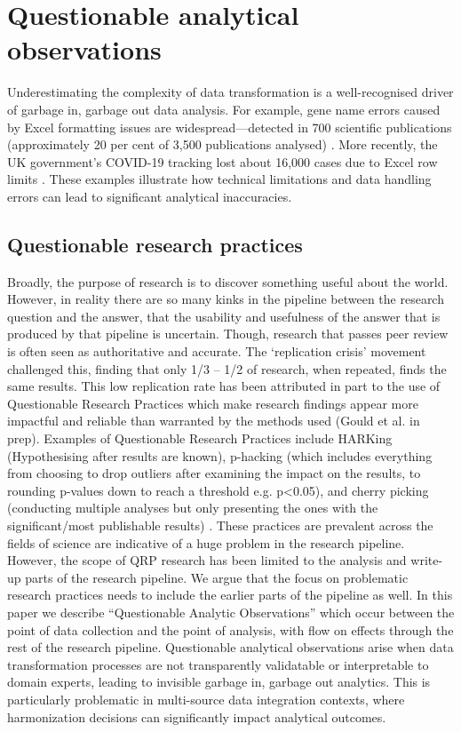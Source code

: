 \documentclass{article}
\begin{document}
\tableofcontents
\listoftables
\listoffigures


\section{Questionable analytical observations}

Underestimating the complexity of data transformation is a well-recognised driver of garbage in, garbage out data analysis. For example, gene name errors caused by Excel formatting issues are widespread---detected in 700 scientific publications (approximately 20 per cent of 3,500 publications analysed) \cite{ziemann2016gene}. More recently, the UK government's COVID-19 tracking lost about 16,000 cases due to Excel row limits \cite{bbc2020excel}. These examples illustrate how technical limitations and data handling errors can lead to significant analytical inaccuracies.

\subsection{Questionable research practices}

Broadly, the purpose of research is to discover something useful about the world. However, in reality there are so many kinks in the pipeline between the research question and the answer, that the usability and usefulness of the answer that is produced by that pipeline is uncertain. Though, research that passes peer review is often seen as authoritative and accurate. The ‘replication crisis’ movement challenged this, finding that only 1/3 – 1/2 of research, when repeated, finds the same results. This low replication rate has been attributed in part to the use of Questionable Research Practices which make research findings appear more impactful and reliable than warranted by the methods used (Gould et al. in prep). Examples of Questionable Research Practices include HARKing (Hypothesising after results are known), p-hacking (which includes everything from choosing to drop outliers after examining the impact on the results, to rounding p-values down to reach a threshold e.g. p<0.05), and cherry picking (conducting multiple analyses but only presenting the ones with the significant/most publishable results) \cite{john2012measuring}. These practices are prevalent across the fields of science \cite{xie2021prevalence} are indicative of a huge problem in the research pipeline. However, the scope of QRP research has been limited to the analysis and write-up parts of the research pipeline. We argue that the focus on problematic research practices needs to include the earlier parts of the pipeline as well. In this paper we describe “Questionable Analytic Observations” which occur between the point of data collection and the point of analysis, with flow on effects through the rest of the research pipeline. Questionable analytical observations arise when data transformation processes are not transparently validatable or interpretable to domain experts, leading to invisible garbage in, garbage out analytics. This is particularly problematic in multi-source data integration contexts, where harmonization decisions can significantly impact analytical outcomes. 
\end{document}
